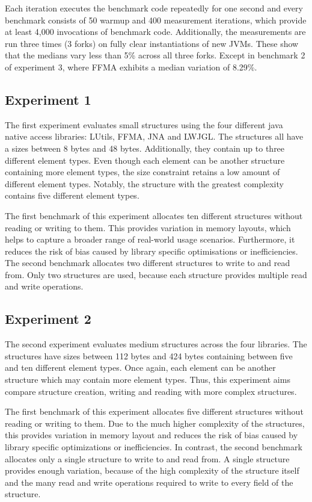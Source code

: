 Each iteration executes the benchmark code repeatedly for one second and every benchmark consists of 50 warmup and 400 measurement iterations, which
provide at least 4,000 invocations of benchmark code.
Additionally, the measurements are run three times (3 forks) on fully clear instantiations of new JVMs.
These show that the medians vary less than 5\% across all three forks.
Except in benchmark 2 of experiment 3, where FFMA exhibits a median variation of 8.29\%.

\subsection{Experiment 1}\label{subsec:experiment-1}

The first experiment evaluates small structures using the four different java native access libraries: LUtils, FFMA, JNA and LWJGL\@.
The structures all have a sizes between 8 bytes and 48 bytes.
Additionally, they contain up to three different element types.
Even though each element can be another structure containing more element types, the size constraint retains a low amount of different
element types.
Notably, the structure with the greatest complexity contains five different element types.

The first benchmark of this experiment allocates ten different structures without reading or writing to them.
This provides variation in memory layouts, which helps to capture a broader range of real-world usage scenarios.
Furthermore, it reduces the risk of bias caused by library specific optimisations or inefficiencies.
The second benchmark allocates two different structures to write to and read from.
Only two structures are used, because each structure provides multiple read and write operations.

\subsection{Experiment 2}\label{subsec:experiment-2}

The second experiment evaluates medium structures across the four libraries.
The structures have sizes between 112 bytes and 424 bytes containing between five and ten different element types.
Once again, each element can be another structure which may contain more element types.
Thus, this experiment aims compare structure creation, writing and reading with more complex structures.

The first benchmark of this experiment allocates five different structures without reading or writing to them.
Due to the much higher complexity of the structures, this provides variation in memory layout and reduces the risk of bias
caused by library specific optimizations or inefficiencies.
In contrast, the second benchmark allocates only a single structure to write to and read from.
A single structure provides enough variation, because of the high complexity of the structure itself and the many read and
write operations required to write to every field of the structure.

